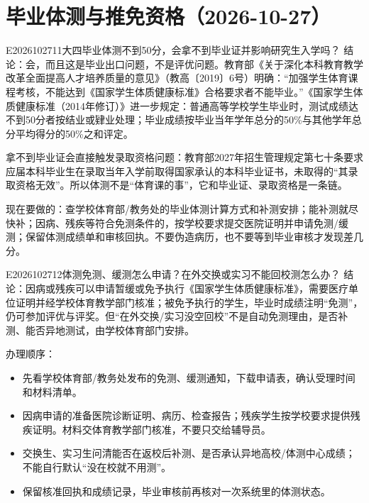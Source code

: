\section{毕业体测与推免资格（2026-10-27）}
\begin{qa}{E2026102711}{大四毕业体测不到50分，会拿不到毕业证并影响研究生入学吗？}
结论：会，而且这是毕业出口问题，不是评优问题。教育部《关于深化本科教育教学改革全面提高人才培养质量的意见》（教高〔2019〕6号）明确：“加强学生体育课程考核，不能达到《国家学生体质健康标准》合格要求者不能毕业。”《国家学生体质健康标准（2014年修订）》进一步规定：普通高等学校学生毕业时，测试成绩达不到50分者按结业或肄业处理；毕业成绩按毕业当年学年总分的50\%与其他学年总分平均得分的50\%之和评定。

拿不到毕业证会直接触发录取资格问题：教育部2027年招生管理规定第七十条要求应届本科毕业生在录取当年入学前取得国家承认的本科毕业证书，未取得的“其录取资格无效”。所以体测不是“体育课的事”，它和毕业证、录取资格是一条链。

现在要做的：查学校体育部/教务处的毕业体测计算方式和补测安排；能补测就尽快补；因病、残疾等符合免测条件的，按学校要求提交医院证明并申请免测/缓测；保留体测成绩单和审核回执。不要伪造病历，也不要等到毕业审核才发现差几分。
\end{qa}


\begin{qa}{E2026102712}{体测免测、缓测怎么申请？在外交换或实习不能回校测怎么办？}
结论：因病或残疾可以申请暂缓或免予执行《国家学生体质健康标准》，需要医疗单位证明并经学校体育教学部门核准；被免予执行的学生，毕业时成绩注明“免测”，仍可参加评优与评奖。但“在外交换/实习没空回校”不是自动免测理由，是否补测、能否异地测试，由学校体育部门安排。

办理顺序：
\begin{itemize}
  \item 先看学校体育部/教务处发布的免测、缓测通知，下载申请表，确认受理时间和材料清单。
  \item 因病申请的准备医院诊断证明、病历、检查报告；残疾学生按学校要求提供残疾证明。材料交体育教学部门核准，不要只交给辅导员。
  \item 交换生、实习生问清能否在返校后补测、是否承认异地高校/体测中心成绩；不能自行默认“没在校就不用测”。
  \item 保留核准回执和成绩记录，毕业审核前再核对一次系统里的体测状态。
\end{itemize}
\end{qa}
